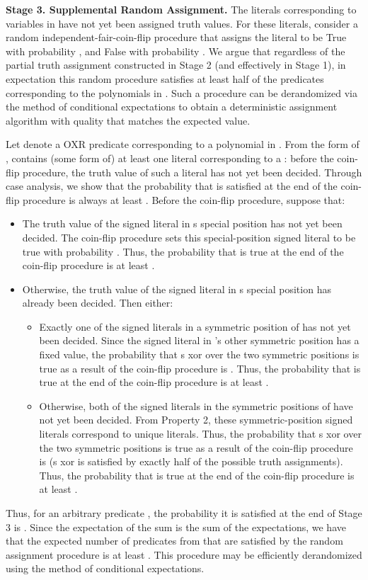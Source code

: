\documentclass{article}
\begin{document}
\noindent \textbf{Stage 3. Supplemental Random Assignment.} The literals corresponding to variables in  have not yet been assigned truth values. For these literals, consider a random independent-fair-coin-flip procedure that assigns the literal to be True with probability , and False with probability . We argue that regardless of the partial truth assignment constructed in Stage 2 (and effectively in Stage 1), in expectation this random procedure satisfies at least half of the predicates corresponding to the polynomials in . Such a procedure can be derandomized via the method of conditional expectations to obtain a deterministic assignment algorithm with quality that matches the expected value.

Let  denote a OXR predicate corresponding to a polynomial in . From the form of ,   contains (some form of) at least one literal corresponding to a : before the coin-flip procedure, the truth value of such a literal has not yet been decided. Through case analysis, we show that the probability that  is satisfied at the end of the coin-flip procedure is always at least .
Before the coin-flip procedure, suppose that:
\begin{itemize}
\item The truth value of the signed literal in s special position has not yet been decided. The coin-flip procedure sets this special-position signed literal to be true with probability . Thus, the probability that  is true at the end of the coin-flip procedure is at least . 
\item Otherwise, the truth value of the signed literal in s special position has already been decided. Then either:
\begin{itemize}
\item Exactly one of the signed literals in a symmetric position of  has not yet been decided. Since the signed literal in 's other symmetric position has a fixed value, the probability that s xor over the two symmetric positions is true as a result of the coin-flip procedure is . Thus, the probability that  is true at the end of the coin-flip procedure is at least . 
\item Otherwise, both of the signed literals in the symmetric positions of  have not yet been decided. From Property 2, these symmetric-position signed literals correspond to unique literals. Thus, the probability that s xor over the two symmetric positions is true as a result of the coin-flip procedure is  (s xor is satisfied by exactly half of the possible truth assignments). Thus, the probability that  is true at the end of the coin-flip procedure is at least . 
\end{itemize}
\end{itemize}
Thus, for an arbitrary predicate , the probability it is satisfied at the end of Stage 3 is . Since the expectation of the sum is the sum of the expectations, we have that the expected number of predicates from   that are satisfied by the random assignment procedure is at least . This procedure may be efficiently derandomized using the method of conditional expectations.
\end{document}
